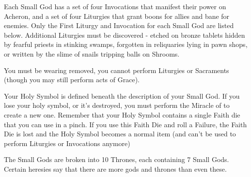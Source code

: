 {

\cbreak


Each Small God has a set of four Invocations that manifest their power on Acheron, and a set of four Liturgies that grant boons for allies and bane for enemies.  Only the First Liturgy and Invocation for each Small God are listed below. Additional Liturgies must be discovered - etched on bronze tablets hidden by fearful priests in stinking swamps, forgotten in reliquaries lying in pawn shops, or written by the slime of snails tripping balls on Shrooms.



You must be wearing removed, you cannot perform Liturgies or Sacraments (though you may still perform acts of Grace).  

Your Holy Symbol is defined beneath the description of your Small God.  If you lose your holy symbol, or it's destroyed, you must perform the Miracle of  to create a new one.  Remember that your Holy Symbol contains a single Faith die that you can use in a pinch.  If you use this Faith Die and roll a Failure, the Faith Die is lost and the Holy Symbol becomes a normal item (and can't be used to perform Liturgies or Invocations anymore)

\newpage


The Small Gods are broken into 10 Thrones, each containing 7 Small Gods.  Certain heresies say that there are more gods and thrones than even these.





}
